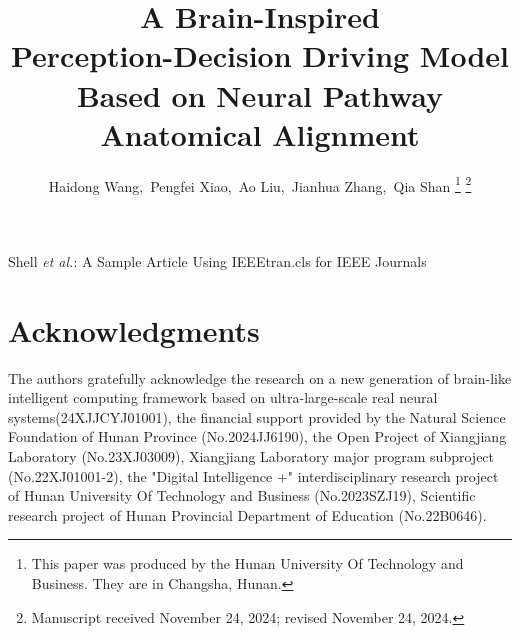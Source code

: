 \documentclass[lettersize,journal]{IEEEtran}
\begin{document}
\title{A Brain-Inspired \\ Perception-Decision Driving Model \\Based on Neural Pathway Anatomical Alignment}

\author{Haidong Wang,~Pengfei Xiao,~Ao Liu,~Jianhua Zhang,~Qia Shan
\thanks{This paper was produced by the Hunan University Of Technology and Business. They are in Changsha, Hunan.}%
\thanks{Manuscript received November 24, 2024; revised November 24, 2024.}}

%
{Shell \MakeLowercase{\textit{et al.}}: A Sample Article Using IEEEtran.cls for IEEE Journals}


\maketitle

    






\section*{Acknowledgments}
The authors gratefully acknowledge the research on a new generation of brain-like intelligent computing framework based on ultra-large-scale real neural systems(24XJJCYJ01001), the financial support provided by the Natural Science Foundation of Hunan Province (No.2024JJ6190), the Open Project of Xiangjiang Laboratory (No.23XJ03009), Xiangjiang Laboratory major program subproject (No.22XJ01001-2), the "Digital Intelligence +" interdisciplinary research project of Hunan University Of Technology and Business (No.2023SZJ19), Scientific research project of Hunan Provincial Department of Education (No.22B0646).





\vfill
\end{document}
